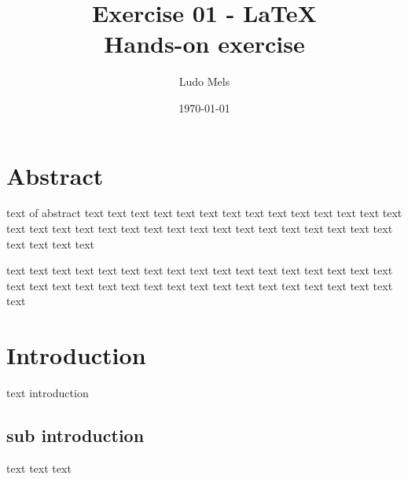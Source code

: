 \documentclass[10pt, a4paper, titlepage]{article}
\title{Exercise 01 - LaTeX \\ \small Hands-on exercise}
\author{Ludo Mels}
\date{\today}
\begin{document}
\maketitle
\newpage

\section*{Abstract}

text of abstract text text text text text text text text text text text text text text text text text text text text text text text text text text text text text text text text text text text 

text text text text text text text text text text text text text text text text text text text text text text text text text text text text text text text text text text text

\section{Introduction}
text introduction

\subsection{sub introduction}
text text text
\end{document}
